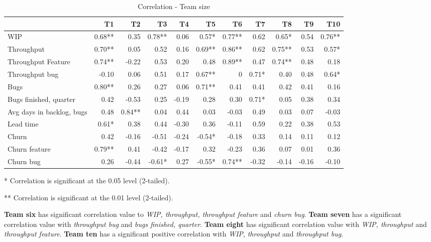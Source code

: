\documentclass[UKenglish]{ifimaster}  %
\begin{document}
 \begin{table}[!htbp]
  \begin{adjustwidth}{-1.5cm}{}
 \centering
 \begin{tabular}{|l|r|r|r|r|r|r|r|r|r|r|}
\hline
 & \bf{T1} & \bf{T2} & \bf{T3} & \bf{T4} & \bf{T5} & \bf{T6} & \bf{T7} & \bf{T8} & \bf{T9} & \bf{T10}\\ \hline
 WIP  & 0.68** & 0.35 & 0.78** & 0.06 & 0.57* & 0.77** & 0.62 & 0.65* & 0.54 & 0.76** \\ \hline
 Throughput  & 0.70** & 0.05 & 0.52 & 0.16 & 0.69** & 0.86** & 0.62 & 0.75** & 0.53 & 0.57* \\ \hline
 Throughput Feature  & 0.74** & -0.22 & 0.53 & 0.20 & 0.48 & 0.89** & 0.47 & 0.74** & 0.48 & 0.18 \\ \hline
 Throughput bug  & -0.10 & 0.06 & 0.51 & 0.17 & 0.67** & 0 &0.71* & 0.40 & 0.48 & 0.64* \\ \hline
 Bugs  & 0.80** & 0.26 & 0.27 & 0.06 & 0.71** & 0.41 & 0.41 & 0.42 & 0.41 & 0.16 \\ \hline
 Bugs finished, quarter  & 0.42 & -0.53 & 0.25 & -0.19 & 0.28 & 0.30 & 0.71* & 0.05 & 0.38 & 0.34 \\ \hline
 Avg days in backlog, bugs  & 0.48 & 0.84** & 0.04 & 0.44 & 0.03 & -0.03 & 0.49 & 0.03 & 0.07 & -0.03 \\ \hline
 Lead time  & 0.61* & 0.38 & 0.44 & -0.30 & 0.36 & -0.11 & 0.59 & 0.22 & 0.38 & 0.53 \\ \hline
 Churn  & 0.42 & -0.16 & -0.51 & -0.24 & -0.54* & -0.18 & 0.33 & 0.14 & 0.11 & 0.12 \\ \hline
 Churn feature  & 0.79** & 0.41 & -0.42 & -0.17 & 0.32 & -0.23 & 0.36 & 0.07 & 0.01 & 0.36 \\ \hline
 Churn bug  & 0.26 & -0.44 & -0.61* & 0.27 & -0.55* & 0.74** & -0.32 & -0.14 & -0.16 & -0.10 \\ \hline
\end{tabular}
 \caption{Correlation - Team size}
 \label{corr:Teams}
 \centerline {* Correlation is significant at the 0.05 level (2-tailed).}
\centerline{** Correlation is significant at the 0.01 level (2-tailed).}
\end{adjustwidth}
\end{table}
\textbf{Team six} has significant correlation value to \textit{WIP, throughput, throughput feature} and \textit{churn bug}. \textbf{Team seven} has a significant correlation value with \textit{throughput bug} and \textit{bugs finished, quarter}. \textbf{Team eight} has significant correlation value with \textit{WIP, throughput} and \textit{throughput feature}. \textbf{Team ten} has a significant positive correlation with  \textit{WIP}, \textit{throughput} and \textit{throughput bug}. 
\end{document}
